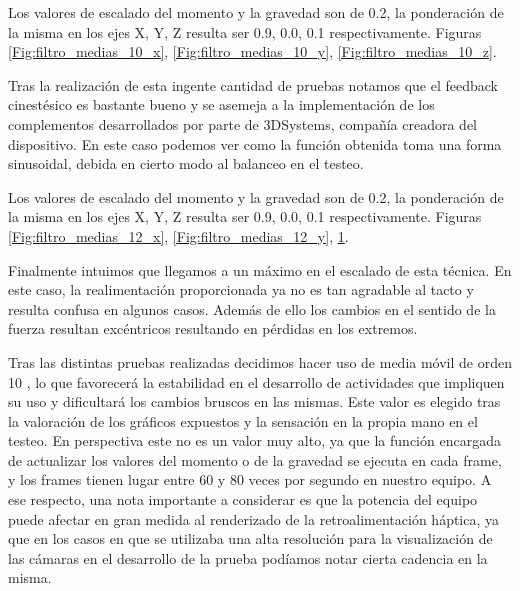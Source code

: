 Los valores de escalado del momento y la gravedad son de 0.2, la ponderación de la misma en los ejes X, Y, Z resulta ser 0.9, 0.0, 0.1 respectivamente. Figuras \ref{Fig:filtro_medias_10_x},  \ref{Fig:filtro_medias_10_y},  \ref{Fig:filtro_medias_10_z}.

Tras la realización de esta ingente cantidad de pruebas notamos que el feedback cinestésico es bastante bueno y se asemeja a la implementación de los complementos desarrollados por parte de 3DSystems, compañía creadora del dispositivo. En este caso podemos ver como la función obtenida toma una forma sinusoidal, debida en cierto modo al balanceo en el testeo.

\begin{figure}[!htb]
   \begin{minipage}{0.33\textwidth}
     \centering
         \caption{ }\label{Fig:filtro_medias_12_x}
   \end{minipage}\hfill
   \begin{minipage}{0.33\textwidth}
     \centering
         \caption{ }\label{Fig:filtro_medias_12_y}
   \end{minipage}
   \begin{minipage}{0.33\textwidth}
     \centering
         \caption{ }\label{Fig:filtro_medias_12_z}
   \end{minipage}\hfill
\end{figure}
Los valores de escalado del momento y la gravedad son de 0.2, la ponderación de la misma en los ejes X, Y, Z resulta ser 0.9, 0.0, 0.1 respectivamente. Figuras \ref{Fig:filtro_medias_12_x},  \ref{Fig:filtro_medias_12_y},  \ref{Fig:filtro_medias_12_z}.

Finalmente intuimos que llegamos a un máximo en el escalado de esta técnica. En este caso, la realimentación proporcionada ya no es tan agradable al tacto y resulta confusa en algunos casos. Además de ello los cambios en el sentido de la fuerza resultan excéntricos resultando en pérdidas en los extremos.

Tras las distintas pruebas realizadas decidimos hacer uso de media móvil de orden 10 \cite{80}, lo que favorecerá la estabilidad en el desarrollo de actividades que impliquen su uso y dificultará los cambios bruscos en las mismas. Este valor es elegido tras la valoración de los gráficos expuestos y la sensación en la propia mano en el testeo. En perspectiva este no es un valor muy alto, ya que la función encargada de actualizar los valores del momento o de la gravedad se ejecuta en cada frame, y los frames tienen lugar entre 60 y 80 veces por segundo en nuestro equipo. A ese respecto, una nota importante a considerar es que la potencia del equipo puede afectar en gran medida al renderizado de la retroalimentación háptica, ya que en los casos en que se utilizaba una alta resolución para la visualización de las cámaras en el desarrollo de la prueba podíamos notar cierta cadencia en la misma.

